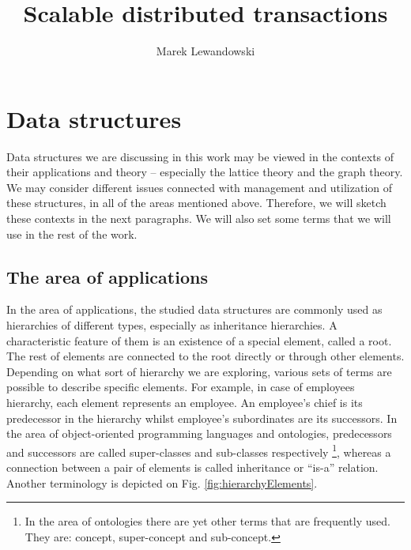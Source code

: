 \documentclass[a4paper,onecolumn,oneside,12pt]{report}
\author{Marek Lewandowski}
\title{Scalable distributed transactions}
\begin{document}
%


\newpage
\mbox{}

%

\tableofcontents

\section{Data structures}\label{sec:basics:dataStructures}

Data structures we are discussing in this work may be viewed in the contexts of their applications and theory --
especially the lattice theory and the graph theory. We may consider different issues connected with management and
utilization of these structures, in all of the areas mentioned above. Therefore, we will sketch these contexts in the
next paragraphs. We will also set some terms that we will use in the rest of the work.

\subsection{The area of applications}
In the area of applications, the studied data structures are commonly used as hierarchies of different types, especially
as inheritance hierarchies. A characteristic feature of them is an existence of a special element, called a root. The
rest of elements are connected to the root directly or through other elements. Depending on what sort of hierarchy we
are exploring, various sets of terms are possible to describe specific elements. For example, in case of employees
hierarchy, each element represents an employee. An employee's chief is its predecessor in the hierarchy whilst
employee's subordinates are its successors. In the area of object-oriented programming languages and ontologies,
predecessors and successors are called super-classes and sub-classes respectively \footnote{In the area of ontologies
there are yet other terms that are frequently used. They are: concept, super-concept and sub-concept.}, whereas a
connection between a pair of elements is called inheritance or ``is-a'' relation. Another terminology is  depicted on
Fig. \ref{fig:hierarchyElements}.

%

%

%

%

%

%

\listoffigures
\listoftables
\listofalgorithms
 


\end{document}
